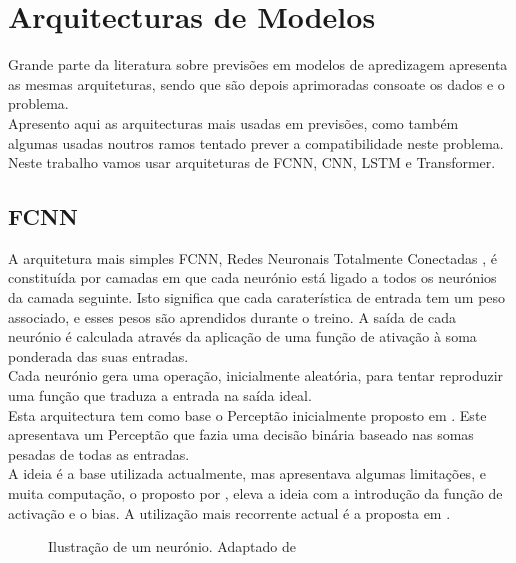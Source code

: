 \section{Arquitecturas de Modelos\label{se:arquiteturas_modelos}}

Grande parte da literatura sobre previsões em modelos de apredizagem apresenta as mesmas arquiteturas, sendo que são depois aprimoradas consoate os dados e o problema. \\
Apresento aqui as arquitecturas mais usadas em previsões, como também algumas usadas noutros ramos tentado prever a compatibilidade neste problema. \\
Neste trabalho vamos usar arquiteturas de \gls{FCNN}, \gls{CNN}, \gls{LSTM} e Transformer.\\




\subsection{FCNN\label{se:fcnn_sec}}

A arquitetura mais simples \gls{FCNN}, Redes Neuronais Totalmente Conectadas , é constituída por camadas em que cada neurónio está ligado a todos os neurónios da camada seguinte. Isto significa que cada caraterística de entrada tem um peso associado, e esses pesos são aprendidos durante o treino. A saída de cada neurónio é calculada através da aplicação de uma função de ativação à soma ponderada das suas entradas.\\
Cada neurónio gera uma operação, inicialmente aleatória, para tentar reproduzir uma função que traduza a entrada na saída ideal.\\
Esta arquitectura tem como base o Perceptão inicialmente proposto em \cite{Rosenblatt1958}. Este apresentava um Perceptão que fazia uma decisão binária baseado nas somas pesadas de todas as entradas.\\
A ideia é a base utilizada actualmente, mas apresentava algumas limitações, e muita computação, o proposto por \cite{Minsky1969}, eleva a ideia com a introdução da função de activação e o bias. A utilização mais recorrente actual é a proposta em \cite{Haykin1999}.


\begin{figure}[H]
	\centering
	\resizebox{\linewidth}{!}{}
	\caption{Ilustração de um neurónio. Adaptado de \cite{Haykin1999}}
	\label{fig:neuronio}
\end{figure}



